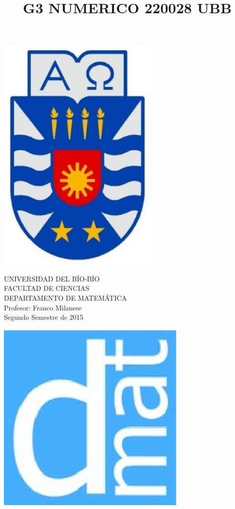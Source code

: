 \documentclass[11pt]{article}
\begin{document}
\title{G3 NUMERICO 220028 UBB}

{\begin{minipage}{2cm}
\hspace*{1cm}\includegraphics[width=0.6\textwidth]{escubo-ubb.eps}
\end{minipage}
\begin{minipage}{12cm}
\small
{\bf \rm 
{
\begin{center}
{\footnotesize UNIVERSIDAD DEL B\'IO-B\'IO} \\
{\scriptsize FACULTAD DE CIENCIAS}  \\
{\scriptsize DEPARTAMENTO DE MATEM\'ATICA}  \\
{\scriptsize Profesor:  Franco Milanese}\\
{\scriptsize Segundo Semestre de 2015}
\end{center}
}}
\end{minipage}}
{\begin{minipage}{2cm}
\hspace*{-0.5cm}\vspace*{-0.05cm}\includegraphics[width=0.7\textwidth]{escudo-dmat.eps}
\end{minipage}}
\end{document}
